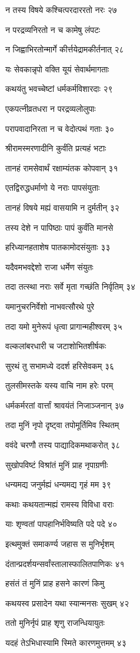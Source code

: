 न तस्य विषये कश्चित्परदाररतो नरः २७

न परद्रव्यनिरतो न च कामेषु लंपटः

न जिह्वाभिरतोन्मार्गे कीर्त्तयेद्रामकीर्तनात् २८

यः सेवकान्नृपो वक्ति यूयं सेवार्थमागताः

कथयंतु भवच्चेष्टां धर्मकर्मविशारदाः २९

एकपत्नीव्रतधरा न परद्रव्यलोलुपाः

परापवादानिरता न च वेदोत्पथं गताः ३०

श्रीरामस्मरणादीनि कुर्वंति प्रत्यहं भटाः

तानहं रामसेवार्थं रक्षाम्यंतक कोपवान् ३१

एतद्विरुद्धधर्माणो ये नराः पापसंयुताः

तानहं विषये मह्यं वासयामि न दुर्मतीन् ३२

तस्य देशे न पापिष्ठाः पापं कुर्वंति मानसे

हरिध्यानहताशेष पातकामोदसंयुताः ३३

यदैवमभवद्देशो राजा धर्मेण संयुतः

तदा तत्स्था नराः सर्वे मृता गच्छंति निर्वृतिम् ३४

यमानुचरनिर्वेशो नाभवत्सौरथे पुरे

तदा यमो मुनेरूपं धृत्वा प्रागान्महीश्वरम् ३५

वल्कलांबरधारी च जटाशोभितशीर्षकः

सुरथं तु सभामध्ये ददर्श हरिसेवकम् ३६

तुलसीमस्तके यस्य वाचि नाम हरेः परम्

धर्मकर्मरतां वार्त्तां श्रावयंतं निजाञ्जनान् ३७

तदा मुनिं नृपो दृष्ट्वा तपोमूर्तिमिव स्थितम्

ववंदे चरणौ तस्य पाद्यादिकमथाकरोत् ३८

सुखोपविष्टं विश्रांतं मुनिं प्राह नृपाग्रणीः

धन्यमद्य जनुर्मह्यं धन्यमद्य गृहं मम ३९

कथाः कथयतान्मह्यं रामस्य विविधा वराः

याः शृण्वतां पापहानिर्भविष्यति पदे पदे ४०

इत्थमुक्तं समाकर्ण्य जहास स मुनिर्भृशम्

दंतान्प्रदर्शयन्सर्वांस्तालास्फालितपाणिकः ४१

हसंतं तं मुनिं प्राह हसने कारणं किमु

कथयस्व प्रसादेन यथा स्यान्मनसः सुखम् ४२

ततो मुनिर्नृपं प्राह शृणु राजन्धियायुतः

यदहं तेऽभिधास्यामि स्मिते कारणमुत्तमम् ४३

